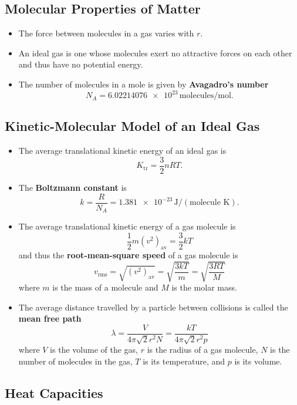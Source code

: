 \documentclass{article}
\begin{document}
\subsection{Molecular Properties of Matter}

\begin{itemize}
  \item The force between molecules in a gas varies with $r$.

  \item An ideal gas is one whose molecules exert no attractive forces on each other and thus have no potential energy.

  \item The number of molecules in a mole is given by \textbf{Avagadro's number} \[N_A = \num{6.02214076e23} \,\text{molecules}/\text{mol}.\]
\end{itemize}

\subsection{Kinetic-Molecular Model of an Ideal Gas}

\begin{itemize}
  \item The average translational kinetic energy of an ideal gas is \[K_\text{tr} = \frac{3}{2} n R T.\]

  \item The \textbf{Boltzmann constant} is \[k = \frac{R}{N_A} = \num{1.381e-23} \,\text{J}/(\text{molecule K}).\]

  \item The average translational kinetic energy of a gas molecule is \[\frac{1}{2} m (v^2)_\text{av} = \frac{3}{2} kT\] and thus the \textbf{root-mean-square speed} of a gas molecule is \[v_\text{rms} = \sqrt{(v^2)_\text{av}} = \sqrt{\frac{3 k T}{m}} = \sqrt{\frac{3 R T}{M}}\] where $m$ is the mass of a molecule and $M$ is the molar mass.

  \item The average distance travelled by a particle between collisions is called the \textbf{mean free path} \[\lambda = \frac{V}{4 \pi \sqrt{2} r^2 N} = \frac{k T}{4 \pi \sqrt{2} r^2 p}\] where $V$ is the volume of the gas, $r$ is the radius of a gas molecule, $N$ is the number of molecules in the gas, $T$ is its temperature, and $p$ is its volume.
\end{itemize}

\subsection{Heat Capacities}
\end{document}
